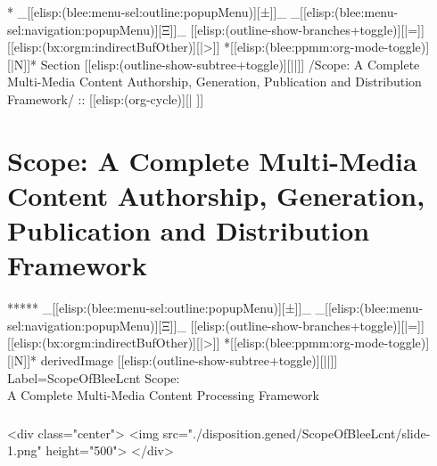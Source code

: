 \begin{whenOrg}
\begin{frame}[fragile,plain,label=thisIsMohsen]
\end{frame}



\begin{whenOrg}
*  _[[elisp:(blee:menu-sel:outline:popupMenu)][±]]_ _[[elisp:(blee:menu-sel:navigation:popupMenu)][Ξ]]_ [[elisp:(outline-show-branches+toggle)][|=]] [[elisp:(bx:orgm:indirectBufOther)][|>]] *[[elisp:(blee:ppmm:org-mode-toggle)][|N]]*  Section    [[elisp:(outline-show-subtree+toggle)][||]]   /Scope: A Complete Multi-Media Content Authorship, Generation, Publication and Distribution Framework/ ::  [[elisp:(org-cycle)][| ]]
\end{whenOrg}

\section{Scope: A Complete Multi-Media Content Authorship, Generation, Publication and Distribution Framework}

\begin{whenOrg}
*****  _[[elisp:(blee:menu-sel:outline:popupMenu)][±]]_ _[[elisp:(blee:menu-sel:navigation:popupMenu)][Ξ]]_ [[elisp:(outline-show-branches+toggle)][|=]] [[elisp:(bx:orgm:indirectBufOther)][|>]] *[[elisp:(blee:ppmm:org-mode-toggle)][|N]]*  derivedImage [[elisp:(outline-show-subtree+toggle)][||]] Label=ScopeOfBleeLcnt Scope:\\ A Complete Multi-Media Content Processing Framework
\end{whenOrg}

\begin{htmlonly}

\begin{frame}[fragile,plain,label=ScopeOfBleeLcnt]
    \frametitle{}
    \framesubtitle{}
    \begin{rawhtml}
<div class="center">
<img src="./disposition.gened/ScopeOfBleeLcnt/slide-1.png" height="500">
</div>
    \end{rawhtml}
\end{frame}
\end{htmlonly}


\end{whenOrg}
